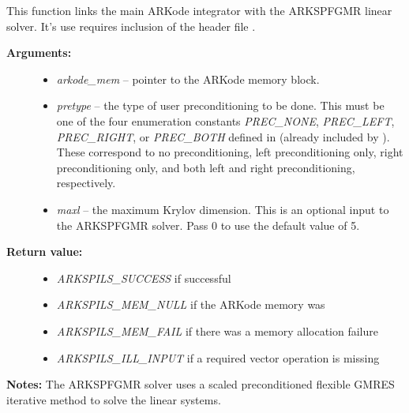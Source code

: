 \documentclass[letterpaper,10pt,english]{sphinxmanual}
\begin{document}

\begin{fulllineitems}
\label{c_interface/User_callable:ARKSpfgmr}
This function links the main ARKode integrator with the ARKSPFGMR
linear solver.  It's use requires inclusion of the header file
.
\begin{description}
\item[{\textbf{Arguments:}}] \leavevmode\begin{itemize}
\item {} 
\emph{arkode\_mem} -- pointer to the ARKode memory block.

\item {} 
\emph{pretype} -- the type of user preconditioning to be done.  This
must be one of the four enumeration constants \emph{PREC\_NONE},
\emph{PREC\_LEFT}, \emph{PREC\_RIGHT}, or \emph{PREC\_BOTH} defined in
 (already included by
). These correspond to no preconditioning,
left preconditioning only, right preconditioning only, and
both left and right preconditioning, respectively.

\item {} 
\emph{maxl} -- the maximum Krylov dimension. This is an optional input
to the ARKSPFGMR solver. Pass 0 to use the default value of 5.

\end{itemize}

\item[{\textbf{Return value:}}] \leavevmode\begin{itemize}
\item {} 
\emph{ARKSPILS\_SUCCESS} if successful

\item {} 
\emph{ARKSPILS\_MEM\_NULL}  if the ARKode memory was 

\item {} 
\emph{ARKSPILS\_MEM\_FAIL}  if there was a memory allocation failure

\item {} 
\emph{ARKSPILS\_ILL\_INPUT} if a required vector operation is missing

\end{itemize}

\end{description}

\textbf{Notes:} The ARKSPFGMR solver uses a scaled preconditioned
flexible GMRES iterative method to solve the linear systems.

\end{fulllineitems}
\end{document}
